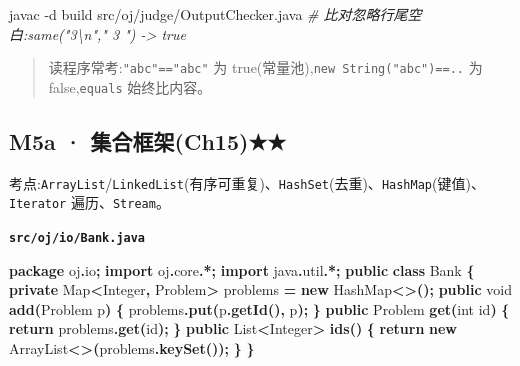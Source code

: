 \documentclass[
  11pt,
]{ctexart}
\newenvironment{Shaded}{\begin{snugshade}}{\end{snugshade}}
\newcommand{\AttributeTok}[1]{\textcolor[rgb]{0.13,0.29,0.53}{#1}}
\newcommand{\BuiltInTok}[1]{#1}
\newcommand{\CommentTok}[1]{\textcolor[rgb]{0.56,0.35,0.01}{\textit{#1}}}
\newcommand{\ControlFlowTok}[1]{\textcolor[rgb]{0.13,0.29,0.53}{\textbf{#1}}}
\newcommand{\DataTypeTok}[1]{\textcolor[rgb]{0.13,0.29,0.53}{#1}}
\newcommand{\ExtensionTok}[1]{#1}
\newcommand{\FunctionTok}[1]{\textcolor[rgb]{0.13,0.29,0.53}{\textbf{#1}}}
\newcommand{\ImportTok}[1]{#1}
\newcommand{\KeywordTok}[1]{\textcolor[rgb]{0.13,0.29,0.53}{\textbf{#1}}}
\newcommand{\NormalTok}[1]{#1}
\newcommand{\OperatorTok}[1]{\textcolor[rgb]{0.81,0.36,0.00}{\textbf{#1}}}
\begin{document}
\begin{Shaded}
\begin{Highlighting}[]
\ExtensionTok{javac} \AttributeTok{{-}d}\NormalTok{ build src/oj/judge/OutputChecker.java}
\CommentTok{\# 比对忽略行尾空白:same("3\textbackslash{}n","  3  ") {-}\textgreater{} true}
\end{Highlighting}
\end{Shaded}

\begin{quote}
读程序常考:\texttt{"abc"=="abc"} 为
true(常量池),\texttt{new\ String("abc")==..} 为 false,\texttt{equals}
始终比内容。
\end{quote}

\hypertarget{m5a-ux96c6ux5408ux6846ux67b6ch15}{%
\subsection{M5a ·
集合框架(Ch15)★★}\label{m5a-ux96c6ux5408ux6846ux67b6ch15}}

考点:\texttt{ArrayList}/\texttt{LinkedList}(有序可重复)、\texttt{HashSet}(去重)、\texttt{HashMap}(键值)、\texttt{Iterator}
遍历、\texttt{Stream}。

\textbf{\texttt{src/oj/io/Bank.java}}

\begin{Shaded}
\begin{Highlighting}[]
\KeywordTok{package}\ImportTok{ oj}\OperatorTok{.}\ImportTok{io}\OperatorTok{;}
\KeywordTok{import} \ImportTok{oj}\OperatorTok{.}\ImportTok{core}\OperatorTok{.*;}
\KeywordTok{import} \ImportTok{java}\OperatorTok{.}\ImportTok{util}\OperatorTok{.*;}
\KeywordTok{public} \KeywordTok{class}\NormalTok{ Bank }\OperatorTok{\{}
    \KeywordTok{private} \BuiltInTok{Map}\OperatorTok{\textless{}}\BuiltInTok{Integer}\OperatorTok{,}\NormalTok{ Problem}\OperatorTok{\textgreater{}}\NormalTok{ problems }\OperatorTok{=} \KeywordTok{new} \BuiltInTok{HashMap}\OperatorTok{\textless{}\textgreater{}();}
    \KeywordTok{public} \DataTypeTok{void} \FunctionTok{add}\OperatorTok{(}\NormalTok{Problem p}\OperatorTok{)} \OperatorTok{\{}\NormalTok{ problems}\OperatorTok{.}\FunctionTok{put}\OperatorTok{(}\NormalTok{p}\OperatorTok{.}\FunctionTok{getId}\OperatorTok{(),}\NormalTok{ p}\OperatorTok{);} \OperatorTok{\}}
    \KeywordTok{public}\NormalTok{ Problem }\FunctionTok{get}\OperatorTok{(}\DataTypeTok{int}\NormalTok{ id}\OperatorTok{)} \OperatorTok{\{} \ControlFlowTok{return}\NormalTok{ problems}\OperatorTok{.}\FunctionTok{get}\OperatorTok{(}\NormalTok{id}\OperatorTok{);} \OperatorTok{\}}
    \KeywordTok{public} \BuiltInTok{List}\OperatorTok{\textless{}}\BuiltInTok{Integer}\OperatorTok{\textgreater{}} \FunctionTok{ids}\OperatorTok{()} \OperatorTok{\{} \ControlFlowTok{return} \KeywordTok{new} \BuiltInTok{ArrayList}\OperatorTok{\textless{}\textgreater{}(}\NormalTok{problems}\OperatorTok{.}\FunctionTok{keySet}\OperatorTok{());} \OperatorTok{\}}
\OperatorTok{\}}
\end{Highlighting}
\end{Shaded}
\end{document}
